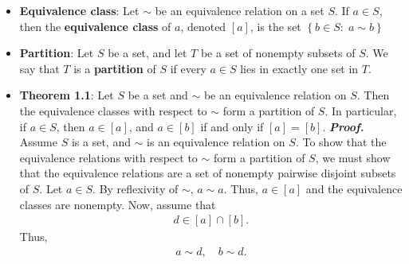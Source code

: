 \documentclass{report}
\begin{document}
\begin{itemize}
\begin{align*}
                a+b,\; b+c
            \end{align*}
            are both even. Hence,
            \begin{align*}
                a + b + b + c = a + 2b + c = a+c+2b
            \end{align*}
            is also even. Notice that $2b$ is even, so we consider two cases, either $a+c$ is odd and $\sim$ is not transitive or $a+c$ is even. If $a + c$ is odd, then we have $a+c = 2\ell +1$, and 
            \begin{align*}
                a+c + 2b = 2\ell +1 + 2b = 2(\ell + b) + 1
            ,\end{align*}
            which is odd. But, we said that $a + c + 2b$ is even, a contradiction. Thus, $a \sim c$ and $\sim$ is transitive.
            \bigbreak \noindent 
            Since $\sim$ is reflexive, symmetric, and transitive, it is an equivalence relation. $\endpf $
        \item \textbf{Equivalence class}: Let $\sim$ be an equivalence relation on a set $S$. If $a \in S$, then the \textbf{equivalence class} of $a$, denoted $[a]$, is the set $\left\{b \in S:\; a \sim b\right\} $
        \item \textbf{Partition}: Let $S$ be a set, and let $T$ be a set of nonempty subsets of $S$. We say that $T$ is a \textbf{partition} of $S$ if every $a\in S$ lies in exactly one set in $T$.
        \item \textbf{Theorem 1.1}: Let $S$ be a set and $\sim$ be an equivalence relation on $S$. Then the equivalence classes with respect to $\sim$ form a partition of $S$. In particular, if $a \in S$, then $a \in [a]$, and $a \in [b]$ if and only if $[a] = [b]$.
            \bigbreak \noindent 
            \textbf{\textit{Proof.}} Assume $S$ is a set, and $\sim$ is an equivalence relation on $S$. To show that the equivalence relations with respect to $\sim$ form a partition of $S$, we must show that the equivalence relations are a set of nonempty pairwise disjoint subsets of $S$.
            \bigbreak \noindent 
            Let $a \in S$. By reflexivity of $\sim$, $a\sim a$. Thus, $a\in [a]$ and the equivalence classes are nonempty. Now, assume that 
            \begin{align*}
                d \in [a] \cap [b]
            .\end{align*}
            Thus,
            \begin{align*}
                a \sim d, \quad b \sim d
            .\end{align*}

\end{itemize}
\end{document}
